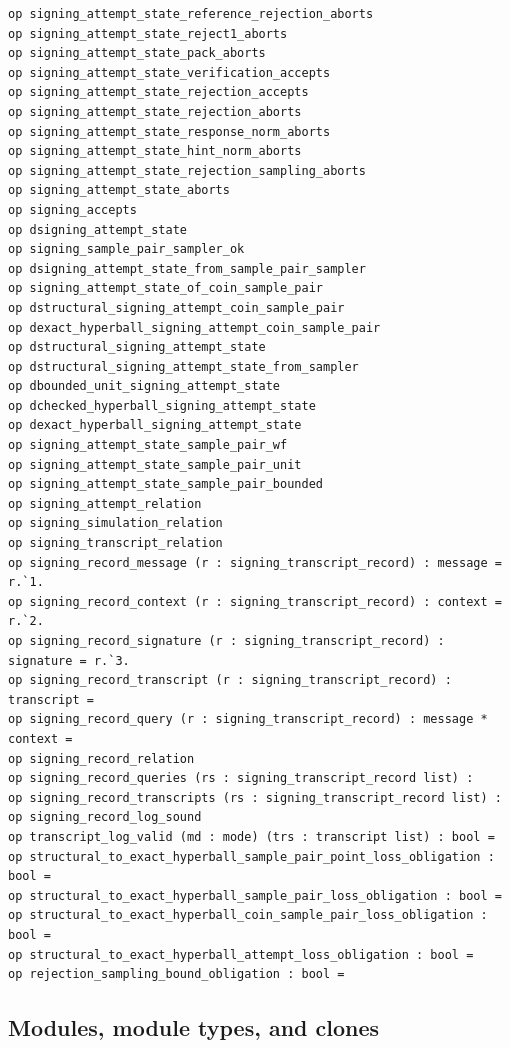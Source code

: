 \begin{lstlisting}[language=EasyCrypt,basicstyle=\ttfamily\tiny]
op signing_attempt_state_reference_rejection_aborts
op signing_attempt_state_reject1_aborts
op signing_attempt_state_pack_aborts
op signing_attempt_state_verification_accepts
op signing_attempt_state_rejection_accepts
op signing_attempt_state_rejection_aborts
op signing_attempt_state_response_norm_aborts
op signing_attempt_state_hint_norm_aborts
op signing_attempt_state_rejection_sampling_aborts
op signing_attempt_state_aborts
op signing_accepts
op dsigning_attempt_state
op signing_sample_pair_sampler_ok
op dsigning_attempt_state_from_sample_pair_sampler
op signing_attempt_state_of_coin_sample_pair
op dstructural_signing_attempt_coin_sample_pair
op dexact_hyperball_signing_attempt_coin_sample_pair
op dstructural_signing_attempt_state
op dstructural_signing_attempt_state_from_sampler
op dbounded_unit_signing_attempt_state
op dchecked_hyperball_signing_attempt_state
op dexact_hyperball_signing_attempt_state
op signing_attempt_state_sample_pair_wf
op signing_attempt_state_sample_pair_unit
op signing_attempt_state_sample_pair_bounded
op signing_attempt_relation
op signing_simulation_relation
op signing_transcript_relation
op signing_record_message (r : signing_transcript_record) : message = r.`1.
op signing_record_context (r : signing_transcript_record) : context = r.`2.
op signing_record_signature (r : signing_transcript_record) : signature = r.`3.
op signing_record_transcript (r : signing_transcript_record) : transcript =
op signing_record_query (r : signing_transcript_record) : message * context =
op signing_record_relation
op signing_record_queries (rs : signing_transcript_record list) :
op signing_record_transcripts (rs : signing_transcript_record list) :
op signing_record_log_sound
op transcript_log_valid (md : mode) (trs : transcript list) : bool =
op structural_to_exact_hyperball_sample_pair_point_loss_obligation : bool =
op structural_to_exact_hyperball_sample_pair_loss_obligation : bool =
op structural_to_exact_hyperball_coin_sample_pair_loss_obligation : bool =
op structural_to_exact_hyperball_attempt_loss_obligation : bool =
op rejection_sampling_bound_obligation : bool =
\end{lstlisting}

\subsection*{Modules, module types, and clones}
\begin{lstlisting}[language=EasyCrypt,basicstyle=\ttfamily\tiny]
\end{lstlisting}

